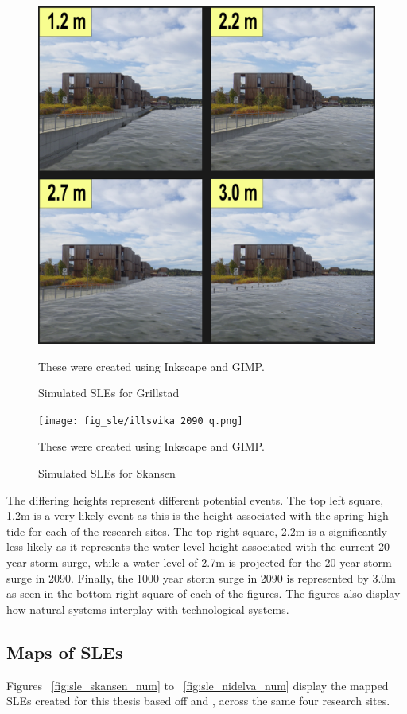 \begin{figure}[H]
    \centering
    \includegraphics[width=16cm]{fig_sle/grillstad 2090 q.png}
    \caption{Simulated SLEs for Grillstad}{These were created using Inkscape and GIMP. }
    \label{fig:SLE-grillstad}
\end{figure}

\begin{figure}[H]
    \centering
    \texttt{[image: fig\_sle/illsvika 2090 q.png]}
    \caption{Simulated SLEs for Skansen}{These were created using Inkscape and GIMP. }
    \label{fig:sle-skansen}
\end{figure}


The differing heights represent different potential events. The top left square, 1.2m is a very likely event as this is the height associated with the spring high tide for each of the research sites. The top right square, 2.2m is a significantly less likely as it represents the water level height associated with the current 20 year storm surge, while a water level of 2.7m is projected for the 20 year storm surge in 2090. Finally, the 1000 year storm surge in 2090 is represented by 3.0m as seen in the bottom right square of each of the figures. The figures also display how natural systems interplay with technological systems.

\subsection{Maps of SLEs}
Figures ~\ref{fig:sle_skansen_num} to ~\ref{fig:sle_nidelva_num}  display the mapped SLEs created for this thesis based off \cite{kartverket_se_2021} and \cite{stormflo_database_stormflo_2021}, across the same four research sites.

